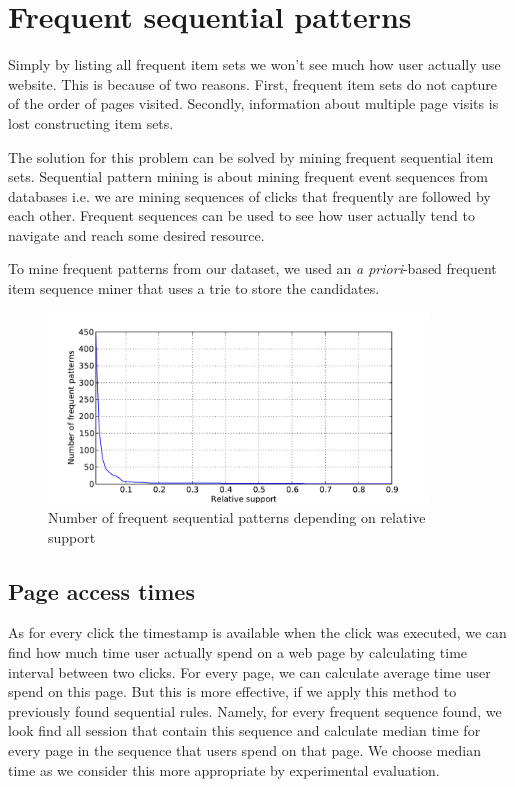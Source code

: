 \documentclass[english,a4paper]{article}
\begin{document}
\section{Frequent sequential patterns}
Simply by listing all frequent item sets we won't see much how user actually use website. This is because of two reasons. First, frequent item sets do not capture of the order of pages visited. Secondly, information about multiple page visits is lost constructing item sets. 

The solution for this problem can be solved by mining frequent sequential item sets. Sequential pattern mining is about mining frequent event sequences from databases i.e. we are mining sequences of clicks that frequently are followed by each other. Frequent sequences can be used to see how user actually tend to navigate and reach some desired resource.

To mine frequent patterns from our dataset, we used  an \emph{a priori}-based frequent item sequence miner that uses a trie to store the candidates\cite{seq_apriori}.

\begin{figure}[H]
  \centering
      \includegraphics[width=0.9\textwidth]{sequential_itemset_count}
  \caption{Number of frequent sequential patterns depending on relative support}
\end{figure}


\subsection{Page access times}
As for every click the timestamp is available when the click was executed, we can find how much time user actually spend on a web page by calculating time interval between two clicks. For every page, we can calculate average time user spend on this page. But this is more effective, if we apply this method to previously found sequential rules. Namely, for every frequent sequence found, we look find all session that contain this sequence and calculate median time for every page in the sequence that users spend on that page.  We choose median time as we consider this more appropriate by experimental evaluation.
\end{document}
